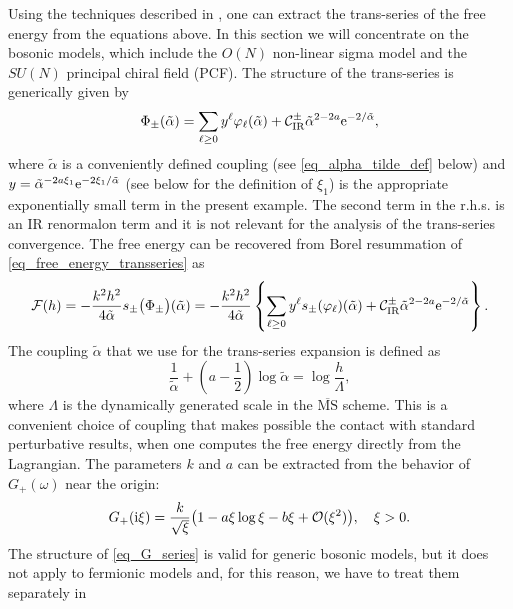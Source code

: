 \documentclass[a4paper,11pt]{article}
\theoremstyle{definition}
\newcommand{\re}{{\rm e}}
\newcommand{\ri}{{\rm i}}
\begin{document}
Using the techniques described in \cite{mmr-an}, one can extract the trans-series of the free energy from the equations above. 
In this section we will concentrate on the bosonic models, which include the $O(N)$ non-linear sigma model 
and the $SU(N)$ principal chiral field (PCF). The structure of the trans-series is generically given by
%
\begin{equation}
\Phi_\pm(\tilde{\alpha}) = \sum_{\ell\geq 0} y^\ell \varphi_\ell(\tilde{\alpha}) + \mathcal{C}_{\text{IR}}^\pm \tilde{\alpha}^{2-2a} \re^{-2/\tilde{\alpha}},
\label{eq_free_energy_transseries}
\end{equation}
%
where $\tilde{\alpha}$ is a conveniently defined coupling (see \eqref{eq_alpha_tilde_def} below) and $y = \tilde\alpha^{-2a\xi_1} \re^{-2\xi_1/\tilde{\alpha}}$ (see below for the definition of $\xi_1$) is the appropriate exponentially small term in the present example. The second term in the r.h.s. is an IR renormalon term and it is not relevant for the analysis of the trans-series convergence. The free energy can be recovered from Borel resummation of \eqref{eq_free_energy_transseries} as
\begin{equation}
\mathcal{F}(h) = -\frac{k^2 h^2}{4 \tilde{\alpha}} s_\pm \bigl( \Phi_\pm \bigr)(\tilde{\alpha}) = -\frac{k^2 h^2}{4 \tilde{\alpha}}\left\{ \sum_{\ell\ge 0} y^\ell s_\pm (\varphi_\ell) (\tilde{\alpha}) + \mathcal{C}_{\text{IR}}^\pm  \tilde{\alpha}^{2-2a} \re^{-2/\tilde{\alpha}} \right\}.
\end{equation}
%
The coupling $\tilde{\alpha}$ that we use for the trans-series expansion is defined as
%
\begin{equation}
\frac{1}{\tilde{\alpha}} + \left( a - \frac{1}{2} \right) \log \tilde{\alpha} = \log \frac{h}{\Lambda},
\label{eq_alpha_tilde_def}
\end{equation}
where $\Lambda$ is the dynamically generated scale in the $\overline{\text{MS}}$ scheme. This is a convenient choice of coupling that makes possible the contact with standard perturbative results, when one computes the free energy directly from the Lagrangian. The parameters $k$ and $a$ can be extracted from the behavior of $G_+(\omega)$ near the origin:
%
\begin{equation}
G_+(\ri\xi) = \frac{k}{\sqrt{\xi}} \bigl( 1 - a\xi \log\xi - b\xi + \mathcal{O}(\xi^2) \bigr), \quad \xi >0.
\label{eq_G_series}
\end{equation}
%
The structure of \eqref{eq_G_series} is valid for generic bosonic models, but it does 
not apply to fermionic models and, for this reason, we have to treat them separately in 
\end{document}
